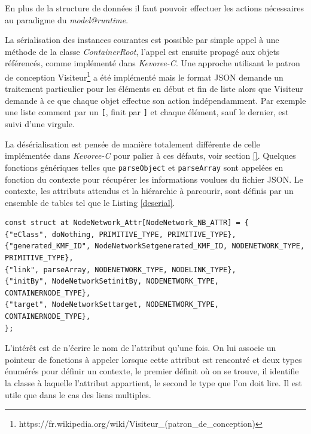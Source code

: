 En plus de la structure de données il faut pouvoir effectuer les actions nécessaires au paradigme du \emph{model@runtime}.

La sérialisation des instances courantes est possible par simple appel à une méthode de la classe \emph{ContainerRoot}, l'appel est ensuite propagé aux objets référencés, comme implémenté dans \emph{Kevoree-C}. Une approche utilisant le patron de conception Visiteur\footnote{https://fr.wikipedia.org/wiki/Visiteur\_(patron\_de\_conception)} a été implémenté mais le format JSON demande un traitement particulier pour les éléments en début et fin de liste alors que Visiteur demande à ce que chaque objet effectue son action indépendamment. Par exemple une liste comment par un \texttt{[}, finit par \texttt{]} et chaque élément, sauf le dernier, est suivi d'une virgule.

La désérialisation est pensée de manière totalement différente de celle implémentée dans \emph{Kevoree-C} pour palier à ces défauts, voir section \ref{}. Quelques fonctions génériques telles que \texttt{parseObject} et \texttt{parseArray} sont appelées en fonction du contexte pour récupérer les informations voulues du fichier JSON. Le contexte, les attributs attendus et la hiérarchie à parcourir, sont définis par un ensemble de tables tel que le Listing \ref{deserial}.


\begin{lstlisting}[frame=single, label={deserial}]
const struct at NodeNetwork_Attr[NodeNetwork_NB_ATTR] = {
{"eClass", doNothing, PRIMITIVE_TYPE, PRIMITIVE_TYPE},
{"generated_KMF_ID", NodeNetworkSetgenerated_KMF_ID, NODENETWORK_TYPE, PRIMITIVE_TYPE},
{"link", parseArray, NODENETWORK_TYPE, NODELINK_TYPE},
{"initBy", NodeNetworkSetinitBy, NODENETWORK_TYPE, CONTAINERNODE_TYPE},
{"target", NodeNetworkSettarget, NODENETWORK_TYPE, CONTAINERNODE_TYPE},
};
\end{lstlisting}

L'intérêt est de n'écrire le nom de l'attribut qu'une fois. On lui associe un pointeur de fonctions à appeler lorsque cette attribut est rencontré et deux types énumérés pour définir un contexte, le premier définit où on se trouve, il identifie la classe à laquelle l'attribut appartient, le second le type que l'on doit lire. Il est utile que dans le cas des liens multiples.

